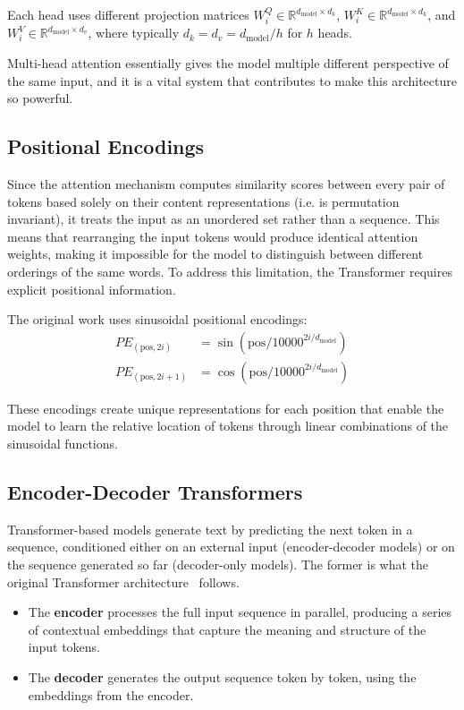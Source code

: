 Each head uses different projection matrices $W_i^Q \in \mathbb{R}^{d_{\text{model}} \times d_k}$, $W_i^K \in \mathbb{R}^{d_{\text{model}} \times d_k}$, and $W_i^V \in \mathbb{R}^{d_{\text{model}} \times d_v}$, where typically $d_k = d_v = d_{\text{model}}/h$ for $h$ heads. 

Multi-head attention essentially gives the model multiple different perspective of the same input, and it is a vital system that contributes to make this architecture so powerful.

\subsection{Positional Encodings}

Since the attention mechanism computes similarity scores between every pair of tokens based solely on their content representations  (i.e. is permutation invariant), it treats the input as an unordered set rather than a sequence. This means that rearranging the input tokens would produce identical attention weights, making it impossible for the model to distinguish between different orderings of the same words. To address this limitation, the Transformer requires explicit positional information.

The original work uses sinusoidal positional encodings:
\begin{align}
PE_{(\text{pos}, 2i)} &= \sin(\text{pos}/10000^{2i/d_{\text{model}}}) \\
PE_{(\text{pos}, 2i+1)} &= \cos(\text{pos}/10000^{2i/d_{\text{model}}})
\end{align}

These encodings create unique representations for each position that enable the model to learn the relative location of tokens through linear combinations of the sinusoidal functions.

\subsection{Encoder-Decoder Transformers}

Transformer-based models generate text by predicting the next token in a sequence, conditioned either on an external input (encoder-decoder models) or on the sequence generated so far (decoder-only models). The former is what the original Transformer architecture~\cite{attention_is_all_you_need} follows.

\begin{itemize}
  \item The \textbf{encoder} processes the full input sequence in parallel, producing a series of contextual embeddings that capture the meaning and structure of the input tokens.
  \item The \textbf{decoder} generates the output sequence token by token, using the embeddings from the encoder.
\end{itemize}

